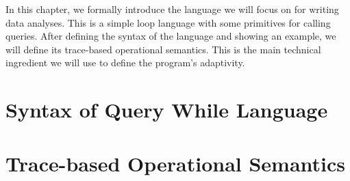 In this chapter, we formally introduce the language we will focus on for writing data analyses.  
This is a simple loop language with some primitives for calling queries. 
After defining the syntax of the language and showing an example, we will define its trace-based operational semantics. 
This is the main technical ingredient we will use to define the program's adaptivity.

\section{Syntax of Query While Language}
\label{sec:language-syntax}

\section{Trace-based Operational Semantics}
\label{sec:language-os}
